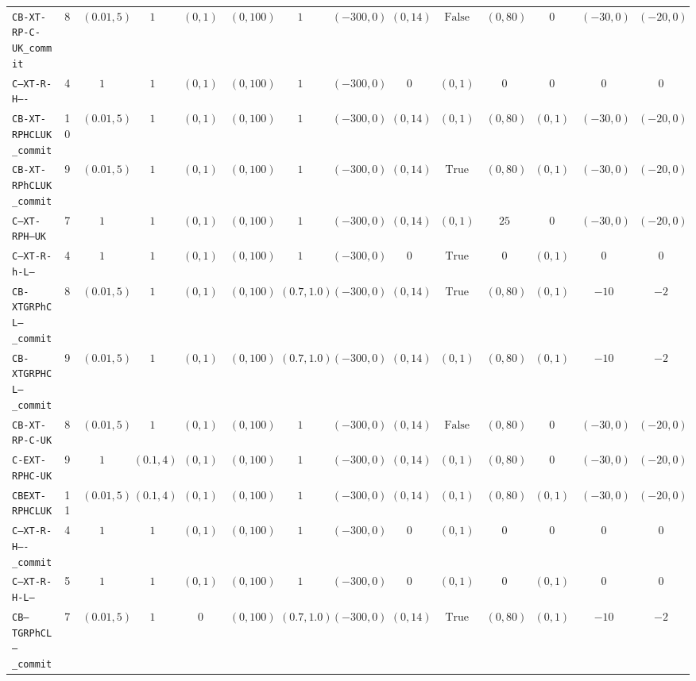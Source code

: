 {\begin{tabular}{lccccccccccccc}
\texttt{CB-XT-RP-C-UK_commit} & 8 & $(0.01,5)$ & $1$ & $(0,1)$ & $(0,100)$ & $1$ & $(-300,0)$ & $(0,14)$ & $\mathrm{False}$ & $(0,80)$ & $0$ & $(-30,0)$ & $(-20,0)$ \\
\texttt{C--XT-R-H----} & 4 & $1$ & $1$ & $(0,1)$ & $(0,100)$ & $1$ & $(-300,0)$ & $0$ & $(0,1)$ & $0$ & $0$ & $0$ & $0$ \\
\texttt{CB-XT-RPHCLUK_commit} & 10 & $(0.01,5)$ & $1$ & $(0,1)$ & $(0,100)$ & $1$ & $(-300,0)$ & $(0,14)$ & $(0,1)$ & $(0,80)$ & $(0,1)$ & $(-30,0)$ & $(-20,0)$ \\
\texttt{CB-XT-RPhCLUK_commit} & 9 & $(0.01,5)$ & $1$ & $(0,1)$ & $(0,100)$ & $1$ & $(-300,0)$ & $(0,14)$ & $\mathrm{True}$ & $(0,80)$ & $(0,1)$ & $(-30,0)$ & $(-20,0)$ \\
\texttt{C--XT-RPH--UK} & 7 & $1$ & $1$ & $(0,1)$ & $(0,100)$ & $1$ & $(-300,0)$ & $(0,14)$ & $(0,1)$ & $25$ & $0$ & $(-30,0)$ & $(-20,0)$ \\
\texttt{C--XT-R-h-L--} & 4 & $1$ & $1$ & $(0,1)$ & $(0,100)$ & $1$ & $(-300,0)$ & $0$ & $\mathrm{True}$ & $0$ & $(0,1)$ & $0$ & $0$ \\
\texttt{CB-XTGRPhCL--_commit} & 8 & $(0.01,5)$ & $1$ & $(0,1)$ & $(0,100)$ & $(0.7,1.0)$ & $(-300,0)$ & $(0,14)$ & $\mathrm{True}$ & $(0,80)$ & $(0,1)$ & $-10$ & $-2$ \\
\texttt{CB-XTGRPHCL--_commit} & 9 & $(0.01,5)$ & $1$ & $(0,1)$ & $(0,100)$ & $(0.7,1.0)$ & $(-300,0)$ & $(0,14)$ & $(0,1)$ & $(0,80)$ & $(0,1)$ & $-10$ & $-2$ \\
\texttt{CB-XT-RP-C-UK} & 8 & $(0.01,5)$ & $1$ & $(0,1)$ & $(0,100)$ & $1$ & $(-300,0)$ & $(0,14)$ & $\mathrm{False}$ & $(0,80)$ & $0$ & $(-30,0)$ & $(-20,0)$ \\
\texttt{C-EXT-RPHC-UK} & 9 & $1$ & $(0.1,4)$ & $(0,1)$ & $(0,100)$ & $1$ & $(-300,0)$ & $(0,14)$ & $(0,1)$ & $(0,80)$ & $0$ & $(-30,0)$ & $(-20,0)$ \\
\texttt{CBEXT-RPHCLUK} & 11 & $(0.01,5)$ & $(0.1,4)$ & $(0,1)$ & $(0,100)$ & $1$ & $(-300,0)$ & $(0,14)$ & $(0,1)$ & $(0,80)$ & $(0,1)$ & $(-30,0)$ & $(-20,0)$ \\
\texttt{C--XT-R-H----_commit} & 4 & $1$ & $1$ & $(0,1)$ & $(0,100)$ & $1$ & $(-300,0)$ & $0$ & $(0,1)$ & $0$ & $0$ & $0$ & $0$ \\
\texttt{C--XT-R-H-L--} & 5 & $1$ & $1$ & $(0,1)$ & $(0,100)$ & $1$ & $(-300,0)$ & $0$ & $(0,1)$ & $0$ & $(0,1)$ & $0$ & $0$ \\
\texttt{CB--TGRPhCL--_commit} & 7 & $(0.01,5)$ & $1$ & $0$ & $(0,100)$ & $(0.7,1.0)$ & $(-300,0)$ & $(0,14)$ & $\mathrm{True}$ & $(0,80)$ & $(0,1)$ & $-10$ & $-2$ \\

\end{tabular}}
